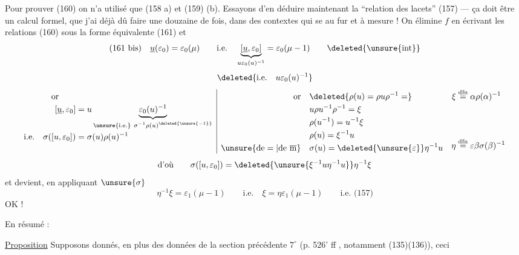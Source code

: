 Pour prouver (160) on n'a utilisé que (158 a) et (159) (b). Essayons d'en déduire maintenant la ``relation des lacets'' (157) --- ça doit être un calcul formel, que j'ai déjà dû faire une douzaine de fois, dans des contextes qui se  au fur et à mesure ! On élimine $f$ en écrivant les relations (160) sous la forme équivalente (161) et
\[
(161\ \text{bis})\quad
\underline u(\varepsilon_0)=\varepsilon_0(\mu)
\qquad\text{i.e.}\quad
\underbrace{[\underline u,\varepsilon_0]}_{u\varepsilon_0(u)^{-1}}
=\varepsilon_0(\mu-1)\qquad\deleted{\unsure{\operatorname{int}}}
\]
\[
\deleted{\text{i.e.}\quad u\varepsilon_0(u)^{-1}}
\]
\[
\begin{array}{l|ll}
\begin{aligned}[t]
\text{or}\qquad&\\
[\underline u,\varepsilon_0]&=
u\underbrace{\varepsilon_0(u)^{-1}}_{\substack{\unsure{\text{i.e.}}\ \sigma^{-1}\rho(u)^{\deleted{\unsure{-1}}}}}\\
\text{i.e.}\quad\sigma([u,\varepsilon_0])&=\sigma(u)\rho(u)^{-1}
\end{aligned}
&
\begin{aligned}[t]
\text{or}\quad&\deleted{\rho(u)=\rho u\rho^{-1}=}\\
&u\rho u^{-1}\rho^{-1}=\xi\\
&\rho(u^{-1})=u^{-1}\xi\\
&\rho(u)=\xi^{-1}u\\
\unsure{\text{de}=|\text{de }\overline{\mathrm m}}\quad&\sigma(u)=\deleted{\unsure{\varepsilon}}\eta^{-1}u
\end{aligned}
&
\begin{aligned}[t]
\xi&\overset{\mathrm{dfn}}{=}\alpha\rho(\alpha)^{-1}\\[4em]
\eta&\overset{\mathrm{dfn}}{=}\varepsilon\beta\sigma(\beta)^{-1}
\end{aligned}
\end{array}
\]
\[
\text{d'où}\qquad
\sigma([u,\varepsilon_0])=
\deleted{\unsure{\xi^{-1}u\eta^{-1}u}}\eta^{-1}\xi
\]
et \unsure{(*)|($\alpha$)} devient, en appliquant $\unsure{\sigma}$
\[
\eta^{-1}\xi=\varepsilon_1(\mu-1)
\qquad\text{i.e.}\quad\xi=\eta\varepsilon_1(\mu-1)
\qquad\text{i.e. (157)}
\]
\hfill OK !


En résumé :

\uline{Proposition} Supposons donnés, en plus des données de la section précédente $7^\circ$ (p. 526' ff \unsure{\}|)}, notamment (135)(136)),  ceci


